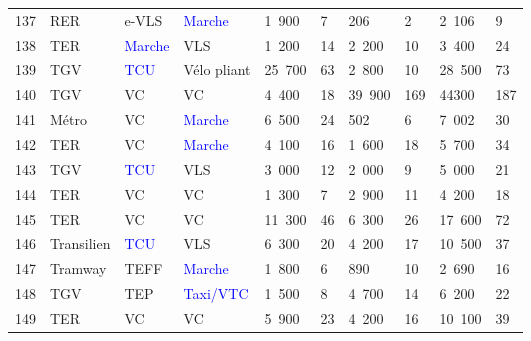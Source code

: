 \begin{longtable}{p{0.7cm}p{1.4cm}p{1.4cm}p{1.6cm}p{0.8cm}p{0.8cm}p{0.8cm}p{0.8cm}p{1.1cm}p{1.1cm}}
    \small{137} & \small{RER} & \small{e-VLS} & \small{\textcolor{blue}{Marche}} & \small{1~900} & \small{7} & \small{206} & \small{2} & \small{2~106} & \small{9}\\
    \small{138} & \small{TER} & \small{\textcolor{blue}{Marche}} & \small{VLS} & \small{1~200} & \small{14} & \small{2~200} & \small{10} & \small{3~400} & \small{24}\\
    \small{139} & \small{TGV} & \small{\textcolor{blue}{TCU}} & \small{Vélo pliant} & \small{25~700} & \small{63} & \small{2~800} & \small{10} & \small{28~500} & \small{73}\\
    \small{140} & \small{TGV} & \small{VC} & \small{VC} & \small{4~400} & \small{18} & \small{39~900} & \small{169} & \small{44300} & \small{187}\\
    \small{141} & \small{Métro} & \small{VC} & \small{\textcolor{blue}{Marche}} & \small{6~500} & \small{24} & \small{502} & \small{6} & \small{7~002} & \small{30} \\
    \small{142} & \small{TER} & \small{VC} & \small{\textcolor{blue}{Marche}} & \small{4~100} & \small{16} & \small{1~600} & \small{18} & \small{5~700} & \small{34} \\
    \small{143} & \small{TGV} & \small{\textcolor{blue}{TCU}} & \small{VLS} & \small{3~000} & \small{12} & \small{2~000} & \small{9} & \small{5~000} & \small{21} \\
    \small{144} & \small{TER} & \small{VC} & \small{VC} & \small{1~300} & \small{7} & \small{2~900} & \small{11} & \small{4~200} & \small{18} \\
    \small{145} & \small{TER} & \small{VC} & \small{VC} & \small{11~300} & \small{46} & \small{6~300} & \small{26} & \small{17~600} & \small{72} \\
    \small{146} & \small{Transilien} & \small{\textcolor{blue}{TCU}} & \small{VLS} & \small{6~300} & \small{20} & \small{4~200} & \small{17} & \small{10~500} & \small{37} \\
    \small{147} & \small{Tramway} & \small{TEFF} & \small{\textcolor{blue}{Marche}} & \small{1~800} & \small{6} & \small{890} & \small{10} & \small{2~690} & \small{16} \\
    \small{148} & \small{TGV} & \small{TEP} & \small{\textcolor{blue}{Taxi/VTC}} & \small{1~500} & \small{8} & \small{4~700} & \small{14} & \small{6~200} & \small{22} \\
    \small{149} & \small{TER} & \small{VC} & \small{VC} & \small{5~900} & \small{23} & \small{4~200} & \small{16} & \small{10~100} & \small{39} \\

\end{longtable}
